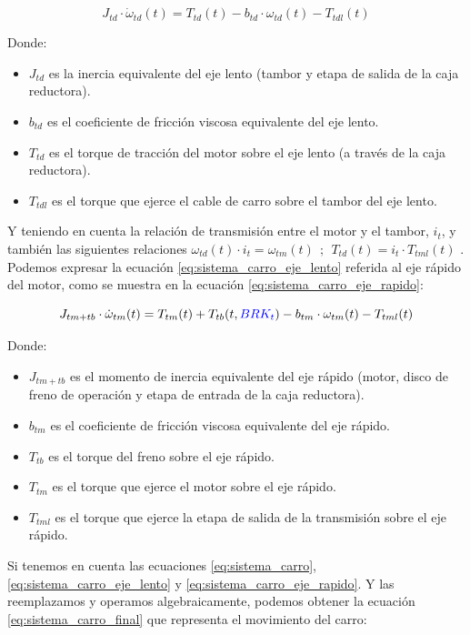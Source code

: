 \documentclass[11pt]{article}
\begin{document}
\begin{equation}
	\label{eq:sistema_carro_eje_lento}
	J_{td}\cdot \dot{\omega}_{td}(t)=T_{td}(t)-b_{td}\cdot\omega_{td}(t) - T_{tdl}(t)
\end{equation}

Donde:
\begin{itemize}
	\item $J_{td}$ es la inercia equivalente del eje lento (tambor y etapa de salida de la caja reductora).
	\item $b_{td}$ es el coeficiente de fricción viscosa equivalente del eje lento.
	\item $T_{td}$ es el torque de tracción del motor sobre el eje lento (a través de la caja reductora).
	\item $T_{tdl}$ es el torque que ejerce el cable de carro sobre el tambor del eje lento.
\end{itemize}

Y teniendo en cuenta la relación de transmisión entre el motor y el tambor, $i_{t}$, y también las siguientes relaciones $\omega_{td}(t)\cdot i_{t} = \omega_{tm}(t) \ \ ;\ \ T_{td}(t)=i_{t}\cdot T_{tml}(t)$ . Podemos expresar la ecuación \ref{eq:sistema_carro_eje_lento} referida al eje rápido del motor, como se muestra en la ecuación \ref{eq:sistema_carro_eje_rapido}:

\begin{equation}
	\label{eq:sistema_carro_eje_rapido}
	J_{tm+tb}\cdot\dot{\omega}_{tm}(t)=T_{tm}(t)+T_{tb}(t,{\color{blue}BRK_{t}})-b_{tm}\cdot\omega_{tm}(t)-T_{tml}(t)
\end{equation}

Donde:
\begin{itemize}
	\item $J_{tm+tb}$ es el momento de inercia equivalente del eje rápido (motor, disco de freno de operación y etapa de entrada de la caja reductora).
	\item $b_{tm}$ es el coeficiente de fricción viscosa equivalente del eje rápido.
	\item $T_{tb}$ es el torque del freno sobre el eje rápido.
	\item $T_{tm}$ es el torque que ejerce el motor sobre el eje rápido.
	\item $T_{tml}$ es el torque que ejerce la etapa de salida de la transmisión sobre el eje rápido.
\end{itemize}

Si tenemos en cuenta las ecuaciones \ref{eq:sistema_carro}, \ref{eq:sistema_carro_eje_lento} y \ref{eq:sistema_carro_eje_rapido}. Y las reemplazamos y operamos algebraicamente, podemos obtener la ecuación \ref{eq:sistema_carro_final} que representa el movimiento del carro:
\end{document}

